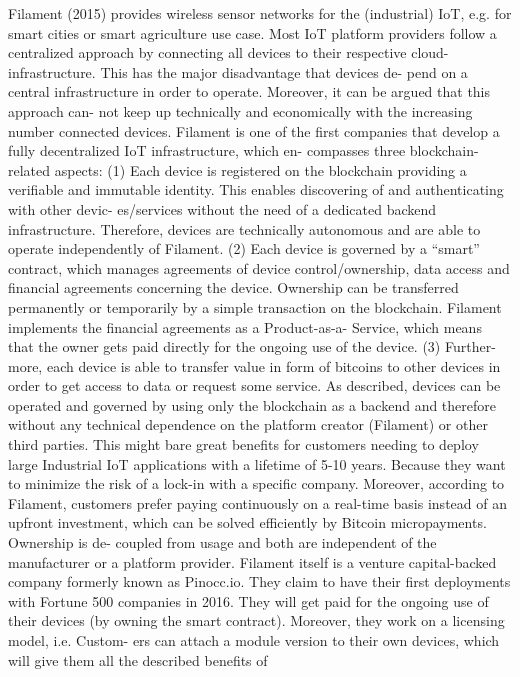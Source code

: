Filament (2015) provides wireless sensor networks for the (industrial) IoT, e.g. for smart cities or smart agriculture use case. Most IoT platform providers follow a centralized approach by connecting all devices to their respective cloud-infrastructure. This has the major disadvantage that devices de- pend on a central infrastructure in order to operate. Moreover, it can be argued that this approach can- not keep up technically and economically with the increasing number connected devices.
Filament is one of the first companies that develop a fully decentralized IoT infrastructure, which en- compasses three blockchain-related aspects: (1) Each device is registered on the blockchain providing a verifiable and immutable identity. This enables discovering of and authenticating with other devic- es/services without the need of a dedicated backend infrastructure. Therefore, devices are technically autonomous and are able to operate independently of Filament. (2) Each device is governed by a “smart” contract, which manages agreements of device control/ownership, data access and financial agreements concerning the device. Ownership can be transferred permanently or temporarily by a simple transaction on the blockchain. Filament implements the financial agreements as a Product-as-a- Service, which means that the owner gets paid directly for the ongoing use of the device. (3) Further- more, each device is able to transfer value in form of bitcoins to other devices in order to get access to data or request some service.
As described, devices can be operated and governed by using only the blockchain as a backend and therefore without any technical dependence on the platform creator (Filament) or other third parties. This might bare great benefits for customers needing to deploy large Industrial IoT applications with a lifetime of 5-10 years. Because they want to minimize the risk of a lock-in with a specific company. Moreover, according to Filament, customers prefer paying continuously on a real-time basis instead of an upfront investment, which can be solved efficiently by Bitcoin micropayments. Ownership is de- coupled from usage and both are independent of the manufacturer or a platform provider.
Filament itself is a venture capital-backed company formerly known as Pinocc.io. They claim to have their first deployments with Fortune 500 companies in 2016. They will get paid for the ongoing use of their devices (by owning the smart contract). Moreover, they work on a licensing model, i.e. Custom- ers can attach a module version to their own devices, which will give them all the described benefits of

